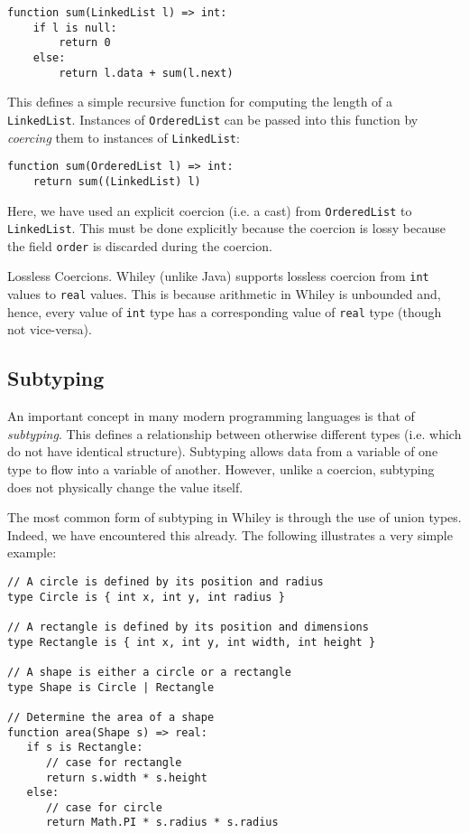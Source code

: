 \begin{lstlisting}
function sum(LinkedList l) => int:
    if l is null:
        return 0
    else:
        return l.data + sum(l.next)
\end{lstlisting}

This defines a simple recursive function for computing the length of a \lstinline{LinkedList}.  Instances of \lstinline{OrderedList} can be passed into this function by {\em coercing} them to instances of \lstinline{LinkedList}:

\begin{lstlisting}
function sum(OrderedList l) => int:
    return sum((LinkedList) l)
\end{lstlisting}

Here, we have used an explicit coercion (i.e. a cast) from \lstinline{OrderedList} to \lstinline{LinkedList}.  This must be done explicitly because the coercion is lossy because the field \lstinline{order} is discarded during the coercion.

\begin{insight}{Lossless Coercions.}
Whiley (unlike Java) supports lossless coercion from \lstinline{int} values to \lstinline{real} values.  This is because arithmetic in Whiley is unbounded and, hence, every value of \lstinline{int} type has a corresponding value of \lstinline{real} type (though not vice-versa).
\end{insight}

\subsection{Subtyping}

An important concept in many modern programming languages is that of {\em subtyping}.  This defines a relationship between otherwise different types (i.e. which do not have identical structure).  Subtyping allows data from a variable of one type to flow into a variable of another.  However, unlike a coercion, subtyping does not physically change the value itself.  

The most common form of subtyping in Whiley is through the use of union types.  Indeed, we have encountered this already.  The following illustrates a very simple example:

\begin{lstlisting}
// A circle is defined by its position and radius
type Circle is { int x, int y, int radius }

// A rectangle is defined by its position and dimensions
type Rectangle is { int x, int y, int width, int height }

// A shape is either a circle or a rectangle
type Shape is Circle | Rectangle

// Determine the area of a shape
function area(Shape s) => real:
   if s is Rectangle:
      // case for rectangle
      return s.width * s.height
   else:
      // case for circle
      return Math.PI * s.radius * s.radius   
\end{lstlisting}


